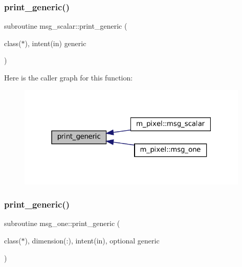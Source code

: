 \subsubsection{\texorpdfstring{print\+\_\+generic()}{print\_generic()}\hspace{0.1cm}{\footnotesize\ttfamily [1/2]}}
{\footnotesize\ttfamily subroutine msg\+\_\+scalar\+::print\+\_\+generic (\begin{DoxyParamCaption}\item[{class($\ast$), intent(in)}]{generic }\end{DoxyParamCaption})\hspace{0.3cm}{\ttfamily [private]}}

Here is the caller graph for this function\+:
\nopagebreak
\begin{figure}[H]
\begin{center}
\leavevmode
\includegraphics[width=313pt]{M__pixel_8f90_aaa8ee15f943d8e1543ae35ab732c3cd2_icgraph}
\end{center}
\end{figure}
\mbox{\label{M__pixel_8f90_a9d5e1620d474ac03a74eeb9b0f7d6ae1}} 
\subsubsection{\texorpdfstring{print\+\_\+generic()}{print\_generic()}\hspace{0.1cm}{\footnotesize\ttfamily [2/2]}}
{\footnotesize\ttfamily subroutine msg\+\_\+one\+::print\+\_\+generic (\begin{DoxyParamCaption}\item[{class($\ast$), dimension(\+:), intent(in), optional}]{generic }\end{DoxyParamCaption})\hspace{0.3cm}{\ttfamily [private]}}

